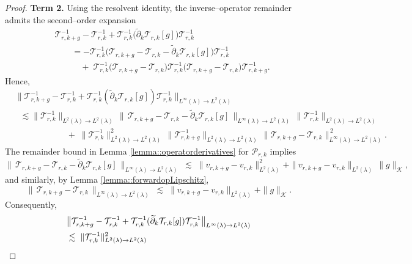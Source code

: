 \documentclass[11pt]{article}
\newcommand{\adk}{\widetilde{\partial}_k}
\theoremstyle{plain}
\begin{document}
\begin{proof}
\noindent \textbf{Term 2.}
Using the resolvent identity, the inverse–operator remainder admits the second–order expansion
\[
\begin{aligned}
&\mathcal{T}_{r,k+g}^{-1} - \mathcal{T}_{r,k}^{-1}
+ \mathcal{T}_{r,k}^{-1}\big(\adk \mathcal{T}_{r,k}[g]\big)\mathcal{T}_{r,k}^{-1} \\
&\qquad=- \mathcal{T}_{r,k}^{-1}\Big( \mathcal{T}_{r,k+g} - \mathcal{T}_{r,k} - \adk \mathcal{T}_{r,k}[g] \Big)\mathcal{T}_{r,k}^{-1} \\
&\qquad\quad +\; \mathcal{T}_{r,k}^{-1}\big(\mathcal{T}_{r,k+g} - \mathcal{T}_{r,k}\big)\mathcal{T}_{r,k}^{-1}\big(\mathcal{T}_{r,k+g} - \mathcal{T}_{r,k}\big)\mathcal{T}_{r,k+g}^{-1}.
\end{aligned}
\]
Hence,
\[
\begin{aligned}
& \big\|\mathcal{T}_{r,k+g}^{-1} - \mathcal{T}_{r,k}^{-1}
+ \mathcal{T}_{r,k}^{-1}(\adk \mathcal{T}_{r,k}[g])\mathcal{T}_{r,k}^{-1}\big\|_{L^\infty(\lambda) \to L^2(\lambda)} \\
&\;\;\lesssim \|\mathcal{T}_{r,k}^{-1}\|_{L^2(\lambda) \to L^2(\lambda)}\,
   \big\|\,\mathcal{T}_{r,k+g} - \mathcal{T}_{r,k} - \adk \mathcal{T}_{r,k}[g]\,\big\|_{L^\infty(\lambda) \to L^2(\lambda)} \,\|\mathcal{T}_{r,k}^{-1}\|_{L^2(\lambda) \to L^2(\lambda)} \\
&\hspace{6em}
   +\; \|\mathcal{T}_{r,k}^{-1}\|_{L^2(\lambda) \to L^2(\lambda)}^2\,
   \|\mathcal{T}_{r,k+g}^{-1}\|_{L^2(\lambda) \to L^2(\lambda)}\,
   \big\|\mathcal{T}_{r,k+g} - \mathcal{T}_{r,k}\big\|_{L^\infty(\lambda) \to L^2(\lambda)}^{\,2}.
\end{aligned}
\]
The remainder bound in Lemma \ref{lemma::operatorderivatives} for $\mathcal{P}_{r,k}$ implies
\[
\big\|\,\mathcal{T}_{r,k+g} - \mathcal{T}_{r,k} - \adk \mathcal{T}_{r,k}[g]\,\big\|_{L^\infty(\lambda) \to L^2(\lambda)} 
\;\lesssim\;  \|v_{r, k+g} - v_{r,k}\|_{L^2(\lambda)}^2
+  \|v_{r,k+g} - v_{r,k}\|_{L^2(\lambda)}\,\|g\|_{\mathcal{K}},
\]
and similarly, by Lemma \ref{lemma::forwardopLipschitz},
\[
\big\|\,\mathcal{T}_{r,k+g} - \mathcal{T}_{r,k}\,\big\|_{L^\infty(\lambda) \to L^2(\lambda)} 
\;\lesssim\;  \|v_{r, k+g} - v_{r,k}\|_{L^2(\lambda)}
+  \|g\|_{\mathcal{K}}.
\]
Consequently,
\[
\begin{aligned}
&\big\|\mathcal{T}_{r,k+g}^{-1} - \mathcal{T}_{r,k}^{-1}
+ \mathcal{T}_{r,k}^{-1}(\adk \mathcal{T}_{r,k}[g])\mathcal{T}_{r,k}^{-1}\big\|_{L^\infty(\lambda) \to L^2(\lambda)} \\
&\lesssim\; \|\mathcal{T}_{r,k}^{-1}\|_{L^2(\lambda) \to L^2(\lambda)}^2 \notag\\

\end{aligned}\]
\end{proof}
\end{document}
